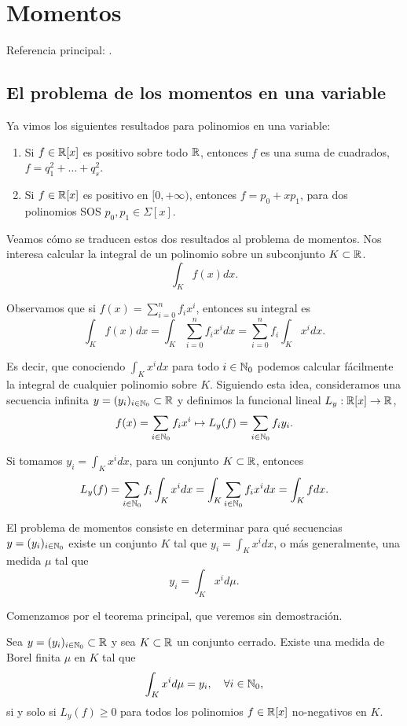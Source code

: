 \chapter{Momentos}
\noindent Referencia principal: \cite[Capítulo 3]{Lasserre2010}.

\section{El problema de los momentos en una variable}

Ya vimos los siguientes resultados para polinomios en una variable:

\begin{enumerate}
\item Si $f \in \mathbb{R}[x]$ es positivo sobre todo $\mathbb{R}$, entonces $f$ es una suma de cuadrados, $f = q_1^2 + \dots + q_s^2$.
\item Si $f \in \mathbb{R}[x]$ es positivo en $[0, +\infty)$, entonces $f = p_0 + x p_1$, para dos polinomios SOS $p_0, p_1 \in \Sigma[x]$.
\end{enumerate}

Veamos cómo se traducen estos dos resultados al problema de momentos. Nos interesa calcular la integral de un polinomio sobre un subconjunto $K \subset \mathbb{R}$.
$$
\int_K f(x) dx.
$$

Observamos que si $f(x) = \sum_{i=0}^n f_i x^i$, entonces su integral es
$$
\int_K f(x) dx = \int_K \sum_{i=0}^n f_i x^i dx = \sum_{i=0}^n f_i \int_K x^i dx.
$$

Es decir, que conociendo $\int_K x^i dx$ para todo $i \in \mathbb{N}_0$ podemos calcular fácilmente la integral de cualquier polinomio sobre $K$.
Siguiendo esta idea, consideramos una secuencia infinita $y = (y_i)_{i \in \mathbb{N}_0} \subset \mathbb{R}$ y definimos la funcional lineal $L_y : \mathbb{R}[x] \rightarrow \mathbb{R}$,
$$
f(x) = \sum_{i \in \mathbb{N}_0} f_i x^i \mapsto L_y(f) = \sum_{i \in \mathbb{N}_0} f_i y_i.
$$

Si tomamos $y_i = \int_{K} x^i dx$, para un conjunto $K \subset \mathbb{R}$, entonces
$$
L_y(f) = \sum_{i \in \mathbb{N}_0} f_i \int_{K} x^i dx = \int_{K} \sum_{i \in \mathbb{N}_0} f_i  x^i dx = \int_{K} f dx.
$$

El problema de momentos consiste en determinar para qu\'e secuencias $y = (y_i)_{i \in \mathbb{N}_0}$ existe un conjunto $K$ tal que $y_i = \int_{K} x^i dx$, o más generalmente, una medida $\mu$ tal que
$$
y_i = \int_K x^i d\mu.
$$

Comenzamos por el teorema principal, que veremos sin demostración.
\begin{theorem}
\label{teo:Riesz}
Sea $y = (y_i)_{i \in \mathbb{N}_0} \subset \mathbb{R}$ y sea $K \subset \mathbb{R}$ un conjunto cerrado.
Existe una medida de Borel finita $\mu$ en $K$ tal que
$$
\int_K x^i d\mu = y_i, \quad \forall i \in \mathbb{N}_0,
$$
si y solo si $L_y(f) \ge 0$ para todos los polinomios $f \in \mathbb{R}[x]$ no-negativos en $K$.
\end{theorem}


